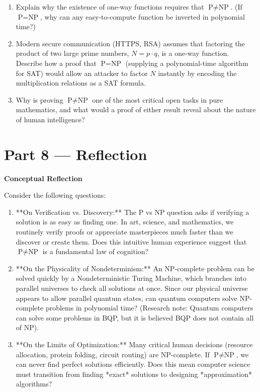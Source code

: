 \documentclass[12pt, a4paper]{book}
\begin{document}
\begin{deepbox}
\begin{enumerate}[label=\textbf{D\arabic*.}]
        \begin{enumerate}[label=(\alph*)]
          \item Explain why the existence of one-way functions requires that $\text{P} \neq \text{NP}$. (If $\text{P} = \text{NP}$, why can any easy-to-compute function be inverted in polynomial time?)
          \item Modern secure communication (HTTPS, RSA) assumes that factoring the product of two large prime numbers, $N = p \cdot q$, is a one-way function.
                Describe how a proof that $\text{P} = \text{NP}$ (supplying a polynomial-time algorithm for SAT) would allow an attacker to factor $N$ instantly by encoding the multiplication relations as a SAT formula.
          \item Why is proving $\text{P} \neq \text{NP}$ one of the most critical open tasks in pure mathematics, and what would a proof of either result reveal about the nature of human intelligence?
        \end{enumerate}
\end{enumerate}
\end{deepbox}

\newpage

\section{Part 8 --- Reflection}

\begin{reflectionbox}
\textbf{Conceptual Reflection}

Consider the following questions:
\begin{enumerate}
  \item **On Verification vs. Discovery:** The P vs NP question asks if verifying a solution is as easy as finding one. In art, science, and mathematics, we routinely verify proofs or appreciate masterpieces much faster than we discover or create them. Does this intuitive human experience suggest that $\text{P} \neq \text{NP}$ is a fundamental law of cognition?
  \item **On the Physicality of Nondeterminism:** An NP-complete problem can be solved quickly by a Nondeterministic Turing Machine, which branches into parallel universes to check all solutions at once. Since our physical universe appears to allow parallel quantum states, can quantum computers solve NP-complete problems in polynomial time? (Research note: Quantum computers can solve some problems in BQP, but it is believed BQP does not contain all of NP).
  \item **On the Limits of Optimization:** Many critical human decisions (resource allocation, protein folding, circuit routing) are NP-complete. If $\text{P} \neq \text{NP}$, we can never find perfect solutions efficiently. Does this mean computer science must transition from finding *exact* solutions to designing *approximation* algorithms?
\end{enumerate}
\end{reflectionbox}
\end{document}
